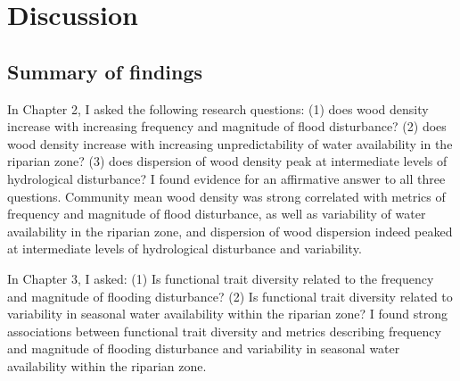
\chapter[Discussion]{Discussion}
\newpage


\section{Summary of findings}
In Chapter 2, I asked the following research questions: (1) does wood density increase with increasing frequency and magnitude of flood disturbance? (2) does wood density increase with increasing unpredictability of water availability in the riparian zone? (3) does dispersion of wood density peak at intermediate levels of hydrological disturbance? I found evidence for an affirmative answer to all three questions. Community mean wood density was strong correlated with metrics of frequency and magnitude of flood disturbance, as well as variability of water availability in the riparian zone, and dispersion of wood dispersion indeed peaked at intermediate levels of hydrological disturbance and variability.

In Chapter 3, I asked: (1) Is functional trait diversity related to the frequency and magnitude of flooding disturbance? (2) Is functional trait diversity related to variability in seasonal water availability within the riparian zone? I found strong associations between functional trait diversity and metrics describing frequency and magnitude of flooding disturbance and variability in seasonal water availability within the riparian zone.

